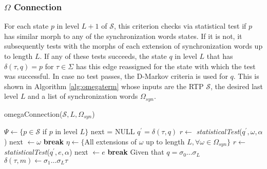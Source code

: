 {\subsubsection{$\Omega$ Connection}


For each state $p$ in level $L+1$ of $\mathcal{S}$, this criterion checks via statistical test if $p$ has similar morph to any of the synchronization words states. If it is not, it subsequently tests with the morphs of each extension of synchronization words up to length $L$. If any of these tests succeeds, the state $q$ in level $L$ that has $\delta(\tau,q) = p$ for $\tau \in \Sigma$ has this edge reassigned for the state with which the test was successful. In case no test passes, the D-Markov criteria is used for $q$. This is shown in Algorithm \ref{alg:omegaterm} whose inputs are the RTP $\mathcal{S}$, the desired last level $L$ and a list of synchronization words $\Omega_{syn}$.  

  \begin{algorithm}
  \caption{omegaConnection($\mathcal{S}, L, \Omega_{syn}$)\label{alg:omegaterm}}
    \begin{algorithmic}[1]
      	\State $\Psi \gets \{p \in \mathcal{S}$ if $p$ in level $L\}$
      		\State next = NULL
      		\For{$\tau \in \Sigma$}
      			\State $q^{\prime} = \delta(\tau,q)$
      				\State $r \gets$ \textit{statisticalTest}($q^{\prime},\omega, \alpha$)
      					\State next $\gets \omega$
      					\State \textbf{break}
      				\EndIf
      			\EndFor
      				\State $\eta \gets \{$All extensions of $\omega$ up to length $L, \forall \omega \in \Omega_{syn}\}$
      				\State $r \gets$ \textit{statisticalTest}($q^{\prime}, e, \alpha$)
      						\State next $\gets e$
      						\State \textbf{break}
      					\EndIf
      				\EndFor
      			\EndIf
      				\State Given that $q = \sigma_0\ldots\sigma_L$
      			\EndIf
      			\State $\delta(\tau,m) \gets \sigma_1\ldots\sigma_L\tau$
      		\EndFor
      	\EndFor
      \EndProcedure
    \end{algorithmic}
  \end{algorithm}

}
